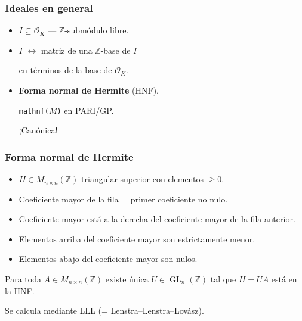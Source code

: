 \documentclass{beamer}
\newcommand{\ZZ}{\mathbb{Z}}
\renewcommand{\O}{\mathcal{O}}
\DeclareMathOperator{\GL}{GL}
\begin{document}
\begin{frame}
  \frametitle{Ideales en general}

  \begin{itemize}
  \item $I \subseteq \O_K$ --- $\ZZ$-submódulo libre.

  \item $I$ $\longleftrightarrow$ matriz de una $\ZZ$-base de $I$

    en términos de la base de $\O_K$.

  \item \textbf{Forma normal de Hermite} (HNF).

    \texttt{mathnf($M$)} en PARI/GP.

    ¡Canónica!
  \end{itemize}
\end{frame}


\begin{frame}
  \frametitle{Forma normal de Hermite}

  \begin{itemize}
  \item $H \in M_{n\times n} (\ZZ)$ triangular superior con elementos $\ge 0$.

  \item Coeficiente mayor de la fila = primer coeficiente no nulo.

  \item Coeficiente mayor está a la derecha del coeficiente mayor de la fila
    anterior.

  \item Elementos arriba del coeficiente mayor son estrictamente menor.

  \item Elementos abajo del coeficiente mayor son nulos.
  \end{itemize}

  Para toda $A \in M_{n\times n} (\ZZ)$ existe única $U \in \GL_n (\ZZ)$ tal que
  $H = UA$ está en la HNF.

  Se calcula mediante LLL (= Lenstra–Lenstra–Lovász).
\end{frame}

\end{document}
